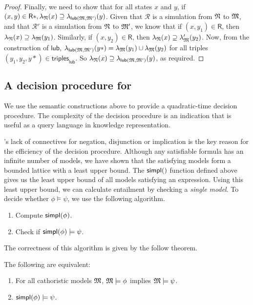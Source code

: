 \begin{proof}
Finally, we need to show that for all states $x$ and $y$, if $(x,y) \in \mathsf{R}*, \lambda_{\frak{N}}(x) \supseteq \lambda_{\mathsf{lub}(\frak{M}, \frak{M}')}(y)$.
Given that $\mathcal{R}$ is a simulation from $\frak{N}$ to $\frak{M}$, and that  $\mathcal{R}'$ is a simulation from $\frak{N}$ to $\frak{M}'$, we know that if $(x,y_1) \in \mathsf{R}$, then $\lambda_\frak{N}(x) \supseteq \lambda_\frak{M}(y_1)$.
Similarly, if  $(x,y_2) \in \mathsf{R}$, then $\lambda_\frak{N}(x) \supseteq \lambda_\frak{M}'(y_2)$.
Now, from the construction of $\mathsf{lub}$, $\lambda_{\mathsf{lub}(\frak{M}, \frak{M}')}(y*) = \lambda_{\frak{M}}(y_1) \cup \lambda_{\frak{M}}(y_2)$ for all triples $(y_1, y_2, y*) \in \mathsf{triples}_\mathsf{lub}$. 
So $\lambda_{\frak{N}}(x) \supseteq \lambda_{\mathsf{lub}(\frak{M}, \frak{M}')}(y)$, as required.
\end{proof}

\subsection{A decision procedure for \cathoristic{}}\label{decisionprocedure}

We use the semantic constructions above to provide a quadratic-time
decision procedure.  The complexity of the decision procedure is an
indication that \cathoristic{} is useful as a query language in knowledge
representation.

\Cathoristic{}'s lack of connectives for negation, disjunction or
implication is the key reason for the efficiency of the decision
procedure.  Although any satisfiable formula has an infinite number of
models, we have shown that the satisfying models form a bounded
lattice with a least upper bound.  The $\SIMPL$ function defined above
gives us the least upper bound of all models satisfying an expression.  Using this least
upper bound, we can calculate entailment by checking a \emph{single
  model}.  To decide whether $\phi \models \psi$, we use the following
algorithm.

\begin{enumerate}

\item Compute $\mathsf{simpl}(\phi)$.

\item Check if $\mathsf{simpl}(\phi) \models \psi$.

\end{enumerate}

\NI The correctness of this algorithm is given by the follow theorem.

\begin{theorem}\label{theorem:decision}
  The following are equivalent:
  \begin{enumerate}
    \item\label{theorem:decision:1} For all cathoristic models $\frak{M}$,
      $\frak{M} \models \phi$ implies $\frak{M} \models \psi$.
    \item\label{theorem:decision:2} $\mathsf{simpl}(\phi) \models \psi$.
  \end{enumerate}
\end{theorem}


